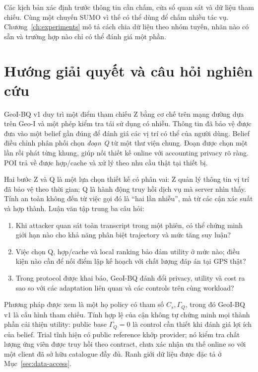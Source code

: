 Các kịch bản xác định trước thông tin cần chấm, cửa sổ quan sát và dữ liệu tham chiếu. Cùng
một chuyến SUMO vì thế có thể dùng để chấm nhiều tác vụ. Chương~\ref{ch:experiments} mô tả
cách chia dữ liệu theo nhóm tuyến, nhãn nào có sẵn và trường hợp nào chỉ có thể đánh giá một phần.

\section{Hướng giải quyết và câu hỏi nghiên cứu}
GeoI-BQ v1 duy trì một điểm tham chiếu Z bằng cơ chế trên mạng đường dựa trên Geo-I và một phép kiểm
tra tái sử dụng có nhiễu. Thông tin đã bảo vệ được đưa vào một belief gần đúng để đánh giá các vị trí
có thể của người dùng. Belief điều chỉnh phân phối chọn \emph{đoạn Q} từ một thư viện chung. Đoạn được
chọn một lần rồi phát từng khung, giúp nối thiết kế online với accounting privacy rõ ràng. POI trả về
được hợp/cache và xử lý theo nhu cầu thật tại thiết bị.

Hai bước Z và Q là một lựa chọn thiết kế có phân vai: Z quản lý thông tin vị trí đã bảo vệ theo thời
gian; Q là hành động truy hồi dịch vụ mà server nhìn thấy. Tính an toàn không đến từ việc gọi đó là
``hai lần nhiễu'', mà từ các cận xác suất và hợp thành. Luận văn tập trung ba câu hỏi:
\begin{enumerate}[label=\textbf{RQ\arabic*.}]
\item Khi attacker quan sát toàn transcript trong một phiên, có thể chứng minh giới hạn nào cho
khả năng phân biệt trajectory và mức tăng suy luận?
\item Việc chọn Q, hợp/cache và local ranking bảo đảm utility ở mức nào; điều kiện nào cần để nối
điểm lập kế hoạch với chất lượng đáp án tại GPS thật?
\item Trong protocol được khai báo, GeoI-BQ đánh đổi privacy, utility và cost ra sao so với các
adaptation liên quan và các controls trên cùng workload?
\end{enumerate}

Phương pháp được xem là một họ policy có tham số $C_s,\Gamma_Q$, trong đó GeoI-BQ v1 là cấu hình
tham chiếu. Tính hợp lệ của cận không tự chứng minh mọi thành phần cải thiện utility: public base
$\Gamma_Q=0$ là control cần thiết khi đánh giá lợi ích của belief. Trial tĩnh hiện có public
reference khớp provider; nó kiểm tra chất lượng ứng viên được truy hồi theo contract, chưa xác nhận
ưu thế online so với một client đã sở hữu catalogue đầy đủ. Ranh giới dữ liệu được đặc tả ở
Mục~\ref{sec:data-access}.


